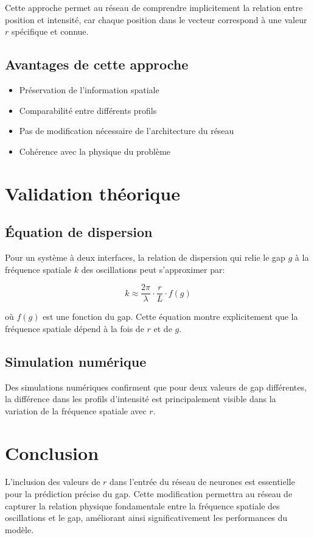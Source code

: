\documentclass{article}
\begin{document}
Cette approche permet au réseau de comprendre implicitement la relation entre position et intensité, car chaque position dans le vecteur correspond à une valeur $r$ spécifique et connue.

\subsection{Avantages de cette approche}
\begin{itemize}
    \item Préservation de l'information spatiale
    \item Comparabilité entre différents profils
    \item Pas de modification nécessaire de l'architecture du réseau
    \item Cohérence avec la physique du problème
\end{itemize}

\section{Validation théorique}

\subsection{Équation de dispersion}
Pour un système à deux interfaces, la relation de dispersion qui relie le gap $g$ à la fréquence spatiale $k$ des oscillations peut s'approximer par:

\begin{equation}
k \approx \frac{2\pi}{\lambda} \cdot \frac{r}{L} \cdot f(g)
\end{equation}

où $f(g)$ est une fonction du gap. Cette équation montre explicitement que la fréquence spatiale dépend à la fois de $r$ et de $g$.

\subsection{Simulation numérique}
Des simulations numériques confirment que pour deux valeurs de gap différentes, la différence dans les profils d'intensité est principalement visible dans la variation de la fréquence spatiale avec $r$.

\section{Conclusion}
L'inclusion des valeurs de $r$ dans l'entrée du réseau de neurones est essentielle pour la prédiction précise du gap. Cette modification permettra au réseau de capturer la relation physique fondamentale entre la fréquence spatiale des oscillations et le gap, améliorant ainsi significativement les performances du modèle.
\end{document}

